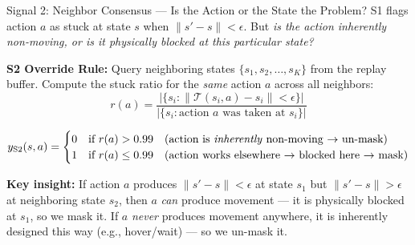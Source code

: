 \documentclass[11pt,aspectratio=169]{beamer}
\begin{document}
\begin{frame}{Signal 2: Neighbor Consensus — Is the Action or the State the Problem?}
    S1 flags action $a$ as stuck at state $s$ when $\|s' - s\| < \epsilon$. But \textit{is the action inherently non-moving, or is it physically blocked at this particular state?}

    \vspace{0.2cm}
    \textbf{S2 Override Rule:} Query neighboring states $\{s_1, s_2, \ldots, s_K\}$ from the replay buffer. Compute the stuck ratio for the \textit{same} action $a$ across all neighbors:
    \begin{equation}
        r(a) = \frac{\big|\{s_i : \|\mathcal{T}(s_i, a) - s_i\| < \epsilon\}\big|}{|\{s_i : \text{action } a \text{ was taken at } s_i\}|}
    \end{equation}

    \begin{equation}
        y_{\text{S2}}(s, a) =
        \begin{cases}
            0 & \text{if } r(a) > 0.99 \quad \text{(action is \textit{inherently} non-moving $\rightarrow$ un-mask)} \\
            1 & \text{if } r(a) \leq 0.99 \quad \text{(action works elsewhere $\rightarrow$ blocked here $\rightarrow$ mask)}
        \end{cases}
    \end{equation}

    \vspace{0.2cm}
    \textbf{Key insight:} If action $a$ produces $\|s'-s\| < \epsilon$ at state $s_1$ but $\|s'-s\| > \epsilon$ at neighboring state $s_2$, then $a$ \textit{can} produce movement — it is physically blocked at $s_1$, so we mask it. If $a$ \textit{never} produces movement anywhere, it is inherently designed this way (e.g., hover/wait) — so we un-mask it.
\end{frame}
\end{document}
